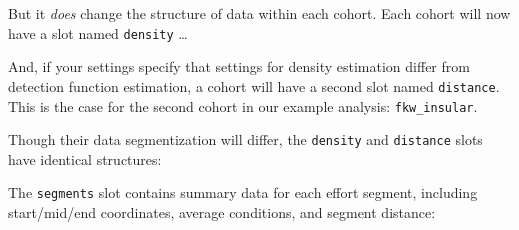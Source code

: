 \documentclass[
]{book}
\newenvironment{Shaded}{\begin{snugshade}}{\end{snugshade}}
\newcommand{\DecValTok}[1]{\textcolor[rgb]{0.00,0.00,0.81}{#1}}
\newcommand{\NormalTok}[1]{#1}
\newcommand{\OperatorTok}[1]{\textcolor[rgb]{0.81,0.36,0.00}{\textbf{#1}}}
\newcommand{\StringTok}[1]{\textcolor[rgb]{0.31,0.60,0.02}{#1}}
\begin{document}
But it \emph{does} change the structure of data within each cohort. Each cohort will now have a slot named \texttt{density} \ldots{}

\begin{Shaded}
\end{Shaded}

And, if your settings specify that settings for density estimation differ from detection function estimation, a cohort will have a second slot named \texttt{distance}. This is the case for the second cohort in our example analysis: \texttt{fkw\_insular}.

\begin{Shaded}
\end{Shaded}

Though their data segmentization will differ, the \texttt{density} and \texttt{distance} slots have identical structures:

\begin{Shaded}
\end{Shaded}

The \texttt{segments} slot contains summary data for each effort segment, including start/mid/end coordinates, average conditions, and segment distance:
\end{document}
